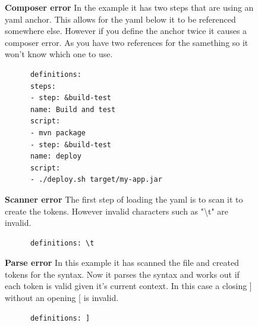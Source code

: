 \documentclass[twoside,12pt,titlepage,a4paper]{article}
\begin{document}
\begin{figure}[!h]
  \centering
  \begin{minipage}[t]{.48\textwidth}
    \textbf{Composer error}
    In the example it has two steps that are using an yaml anchor. This allows for the yaml below it to be referenced somewhere else. However if you define the anchor twice it causes a composer error. As you have two references for the samething so it won't know which one to use.
  \end{minipage}%
  \hfill
  \begin{minipage}[t]{.48\textwidth}
    \begin{verbatim}
      definitions: 
      steps:
      - step: &build-test
      name: Build and test
      script:
      - mvn package
      - step: &build-test
      name: deploy
      script:
      - ./deploy.sh target/my-app.jar
    \end{verbatim}
  \end{minipage}
\end{figure}

\begin{figure}[!h]
  \centering
  \begin{minipage}[t]{.48\textwidth}
    \textbf{Scanner error}
    The first step of loading the yaml is to scan it to create the tokens. However invalid characters such as "\textbackslash t" are invalid. 
  \end{minipage}%
  \hfill
  \begin{minipage}[t]{.48\textwidth}
    \begin{verbatim}
      definitions: \t
    \end{verbatim}
  \end{minipage}
\end{figure}
\begin{figure}[!ht]
  \centering
  \begin{minipage}[t]{.48\textwidth}
    \textbf{Parse error}
    In this example it has scanned the file and created tokens for the syntax. Now it parses the syntax and works out if each token is valid given it's current context. In this case a closing ] without an opening [ is invalid.
  \end{minipage}%
  \hfill
  \begin{minipage}[t]{.48\textwidth}
    \begin{verbatim}
      definitions: ]
    \end{verbatim}
  \end{minipage}
\end{figure}
\end{document}
